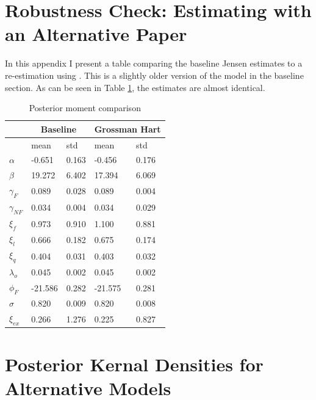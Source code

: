 \section{Robustness Check: Estimating with an Alternative Paper}
\label{sec:gross}

In this appendix I present a table comparing the baseline Jensen estimates to a re-estimation using
\citet{grossman1986costs}.  This is a slightly older version of the model in the baseline section.  As can be seen in Table \ref{tab:post_comp}, the estimates are almost 
identical.

\begin{table}[!ht]
    \centering
    \begin{tabular}{lllll}
        \hline
         & \multicolumn{2}{c}{Baseline}        & \multicolumn{2}{c}{Grossman Hart} \\ \hline\hline
                            & mean    & std   & mean       & std    \\ 
         $\alpha$           & -0.651  & 0.163 & -0.456     & 0.176  \\ 
         $\beta$            & 19.272  & 6.402 & 17.394     & 6.069  \\ 
         $\gamma_{F}$       & 0.089   & 0.028 & 0.089      & 0.004  \\ 
         $\gamma_{NF}$      & 0.034   & 0.004 & 0.034      & 0.029  \\ 
         $\xi_f$            & 0.973   & 0.910 & 1.100      & 0.881  \\ 
         $\xi_l$            & 0.666   & 0.182 & 0.675      & 0.174  \\ 
         $\xi_q$            & 0.404   & 0.031 & 0.403      & 0.032  \\ 
         $\lambda_o$        & 0.045   & 0.002 & 0.045      & 0.002  \\ 
         $\phi_F$           & -21.586 & 0.282 & -21.575    & 0.281  \\ 
         $\sigma$           & 0.820   & 0.009 & 0.820      & 0.008  \\ 
         $\xi_{ex}$         & 0.266   & 1.276 & 0.225      & 0.827  \\ \hline
    \end{tabular}
    \caption{Posterior moment comparison}
    \label{tab:post_comp}
\end{table}

\section{Posterior Kernal Densities for Alternative Models}
\label{sec:altmodels}

